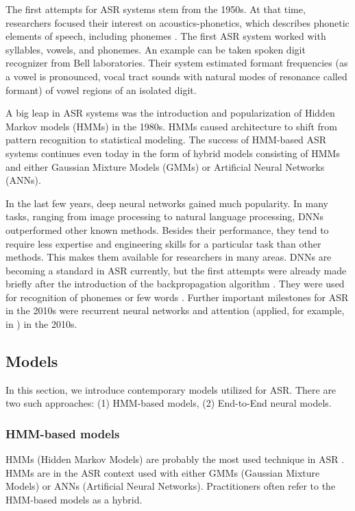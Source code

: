The first attempts for ASR systems stem from the 1950s. At that time, researchers focused their interest on acoustics-phonetics, which describes phonetic elements of speech, including phonemes . The first ASR system worked with syllables, vowels, and phonemes. An example can be taken spoken digit recognizer from Bell laboratories. Their system estimated formant frequencies (as a vowel is pronounced, vocal tract sounds with natural modes of resonance called formant) of vowel regions of an isolated digit. 

A big leap in ASR systems was the introduction and popularization of Hidden Markov models (HMMs) in the 1980s. HMMs caused architecture to shift from pattern recognition to statistical modeling. The success of HMM-based ASR systems continues even today in the form of hybrid models consisting of HMMs and either Gaussian Mixture Models (GMMs) or Artificial Neural Networks (ANNs).

In the last few years, deep neural networks gained much popularity. In many tasks, ranging from image processing to natural language processing, DNNs outperformed other known methods. Besides their performance, they tend to require less expertise and engineering skills for a particular task than other methods. This makes them available for researchers in many areas. DNNs are becoming a standard in ASR currently, but the first attempts were already made briefly after the introduction of the backpropagation algorithm . They were used for recognition of phonemes  or few words . Further important milestones for ASR in the 2010s were recurrent neural networks and attention (applied, for example, in ) in the 2010s.

\subsection{Models}
In this section, we introduce contemporary models utilized for ASR. There are two such approaches: (1) HMM-based models, (2) End-to-End neural models.

\subsubsection{HMM-based models}
HMMs (Hidden Markov Models) are probably the most used technique in ASR . HMMs are in the ASR context used with either GMMs (Gaussian Mixture Models)  or ANNs (Artificial Neural Networks).  Practitioners often refer to the HMM-based models as a hybrid.

